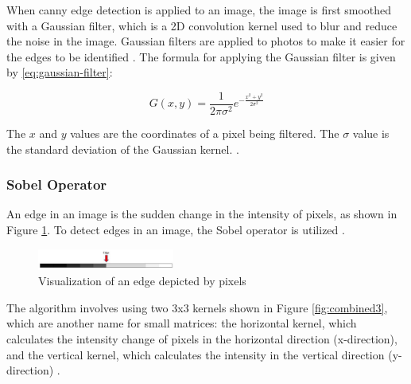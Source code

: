 \documentclass[conference]{IEEEtran}
\begin{document}
When canny edge detection is applied to an image, the image is first smoothed with a Gaussian filter, which is a 2D convolution kernel used to blur and reduce the noise in the image. Gaussian filters are applied to photos to make it easier for the edges to be identified \cite{b12}. 
The formula for applying the Gaussian filter is given by \ref{eq:gaussian-filter}:

\begin{equation}
G(x, y) = \frac{1}{2\pi\sigma^2} e^{-\frac{x^2+y^2}{2\sigma^2}}
\label{eq:gaussian-filter}
\end{equation}

The $x$ and $y$ values are the coordinates of a pixel being filtered. The $\sigma$ value is the standard deviation of the Gaussian kernel. \cite{b12}.

\subsubsection{Sobel Operator}

An edge in an image is the sudden change in the intensity of pixels, as shown in Figure \ref{fig:Picture7}. To detect edges in an image, the Sobel operator is utilized \cite{b12}.

\begin{figure}[h]
    \centering
    \includegraphics[width=0.4\textwidth]{images/Picture7.png}
    \caption{Visualization of an edge depicted by pixels \cite{b12}}
    \label{fig:Picture7}
    
\end{figure}

The algorithm involves using two 3x3 kernels shown in Figure \ref{fig:combined3}, which are another name for small matrices: the horizontal kernel, which calculates the intensity change of pixels in the horizontal direction (x-direction), and the vertical kernel, which calculates the intensity in the vertical direction (y-direction) \cite{b12}.
\end{document}
